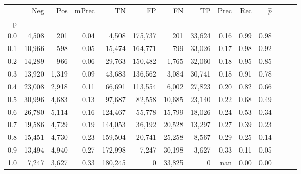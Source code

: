 \begin{tabular}{rrrrrrrrrrrrrr}
\toprule
{} &     Neg &    Pos & mPrec &       TN &       FP &      FN &      TP &  Prec &   Rec & $\hat{p}$ \\
p   &         &        &       &          &          &         &         &       &       &           \\
\midrule
0.0 &   4,508 &    201 &  0.04 &    4,508 &  175,737 &     201 &  33,624 &  0.16 &  0.99 &      0.98 \\
0.1 &  10,966 &    598 &  0.05 &   15,474 &  164,771 &     799 &  33,026 &  0.17 &  0.98 &      0.92 \\
0.2 &  14,289 &    966 &  0.06 &   29,763 &  150,482 &   1,765 &  32,060 &  0.18 &  0.95 &      0.85 \\
0.3 &  13,920 &  1,319 &  0.09 &   43,683 &  136,562 &   3,084 &  30,741 &  0.18 &  0.91 &      0.78 \\
0.4 &  23,008 &  2,918 &  0.11 &   66,691 &  113,554 &   6,002 &  27,823 &  0.20 &  0.82 &      0.66 \\
0.5 &  30,996 &  4,683 &  0.13 &   97,687 &   82,558 &  10,685 &  23,140 &  0.22 &  0.68 &      0.49 \\
0.6 &  26,780 &  5,114 &  0.16 &  124,467 &   55,778 &  15,799 &  18,026 &  0.24 &  0.53 &      0.34 \\
0.7 &  19,586 &  4,729 &  0.19 &  144,053 &   36,192 &  20,528 &  13,297 &  0.27 &  0.39 &      0.23 \\
0.8 &  15,451 &  4,730 &  0.23 &  159,504 &   20,741 &  25,258 &   8,567 &  0.29 &  0.25 &      0.14 \\
0.9 &  13,494 &  4,940 &  0.27 &  172,998 &    7,247 &  30,198 &   3,627 &  0.33 &  0.11 &      0.05 \\
1.0 &   7,247 &  3,627 &  0.33 &  180,245 &        0 &  33,825 &       0 &   nan &  0.00 &      0.00 \\
\bottomrule
\end{tabular}
